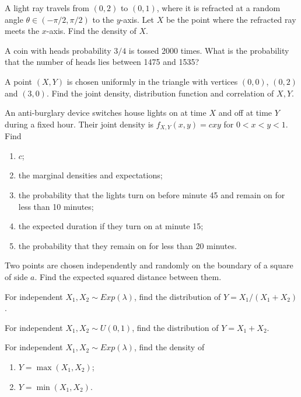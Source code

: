 \documentclass[a4paper]{report}
\begin{document}
\begin{problem}
A light ray travels from $(0,2)$ to $(0,1)$, where it is refracted at a random angle $\theta\in(-\pi/2,\pi/2)$ to the $y$-axis. Let $X$ be the point where the refracted ray meets the $x$-axis. Find the density of $X$.
\end{problem}
\begin{problembook}
A coin with heads probability $3/4$ is tossed 2000 times. What is the probability that the number of heads lies between 1475 and 1535?
\end{problembook}
\begin{problem}
A point $(X,Y)$ is chosen uniformly in the triangle with vertices $(0,0)$, $(0,2)$ and $(3,0)$. Find the joint density, distribution function and correlation of $X,Y$.
\end{problem}
\begin{problembook}
An anti-burglary device switches house lights on at time $X$ and off at time $Y$ during a fixed hour. Their joint density is $f_{X,Y}(x,y)=cxy$ for $0<x<y<1$. Find
\begin{enumerate}
\item $c$;
\item the marginal densities and expectations;
\item the probability that the lights turn on before minute 45 and remain on for less than 10 minutes;
\item the expected duration if they turn on at minute 15;
\item the probability that they remain on for less than 20 minutes.
\end{enumerate}
\end{problembook}
\begin{problem}
Two points are chosen independently and randomly on the boundary of a square of side $a$. Find the expected squared distance between them.
\end{problem}
\begin{problembook}
For independent $X_1,X_2\sim Exp(\lambda)$, find the distribution of $Y=X_1/(X_1+X_2)$.
\end{problembook}
\begin{problembook}
For independent $X_1,X_2\sim U(0,1)$, find the distribution of $Y=X_1+X_2$.
\end{problembook}
\begin{problembook}
For independent $X_1,X_2\sim Exp(\lambda)$, find the density of
\begin{enumerate}\item $Y=\max(X_1,X_2)$;\item $Y=\min(X_1,X_2)$.\end{enumerate}
\end{problembook}
\end{document}
